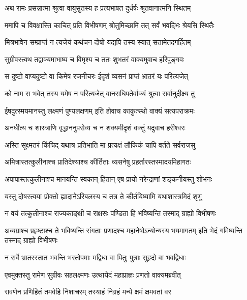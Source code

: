 
\twolineshloka
{अथ रामः प्रसन्नात्मा श्रुत्वा वायुसुतस्य ह}
{प्रत्यभाषत दुर्धर्षः श्रुतवानात्मनि स्थितम्} %

\twolineshloka
{ममापि च विवक्षास्ति काचित् प्रति विभीषणम्}
{श्रोतुमिच्छामि तत् सर्वं भवद्भिः श्रेयसि स्थितैः} %

\twolineshloka
{मित्रभावेन सम्प्राप्तं न त्यजेयं कथंचन}
{दोषो यद्यपि तस्य स्यात् सतामेतदगर्हितम्} %

\twolineshloka
{सुग्रीवस्त्वथ तद्वाक्यमाभाष्य च विमृश्य च}
{ततः शुभतरं वाक्यमुवाच हरिपुङ्गवः} %

\twolineshloka
{स दुष्टो वाप्यदुष्टो वा किमेष रजनीचरः}
{ईदृशं व्यसनं प्राप्तं भ्रातरं यः परित्यजेत्} %

\twolineshloka
{को नाम स भवेत् तस्य यमेष न परित्यजेत्}
{वानराधिपतेर्वाक्यं श्रुत्वा सर्वानुदीक्ष्य तु} %

\twolineshloka
{ईषदुत्स्मयमानस्तु लक्ष्मणं पुण्यलक्षणम्}
{इति होवाच काकुत्स्थो वाक्यं सत्यपराक्रमः} %

\twolineshloka
{अनधीत्य च शास्त्राणि वृद्धाननुपसेव्य च}
{न शक्यमीदृशं वक्तुं यदुवाच हरीश्वरः} %

\twolineshloka
{अस्ति सूक्ष्मतरं किंचिद् यथात्र प्रतिभाति मा}
{प्रत्यक्षं लौकिकं चापि वर्तते सर्वराजसु} %

\twolineshloka
{अमित्रास्तत्कुलीनाश्च प्रातिदेश्याश्च कीर्तिताः}
{व्यसनेषु प्रहर्तारस्तस्मादयमिहागतः} %

\twolineshloka
{अपापास्तत्कुलीनाश्च मानयन्ति स्वकान् हितान्}
{एष प्रायो नरेन्द्राणां शङ्कनीयस्तु शोभनः} %

\twolineshloka
{यस्तु दोषस्त्वया प्रोक्तो ह्यादानेऽरिबलस्य च}
{तत्र ते कीर्तयिष्यामि यथाशास्त्रमिदं शृणु} %

\twolineshloka
{न वयं तत्कुलीनाश्च राज्यकाङ्क्षी च राक्षसः}
{पण्डिता हि भविष्यन्ति तस्माद् ग्राह्यो विभीषणः} %

\threelineshloka
{अव्यग्राश्च प्रहृष्टाश्च ते भविष्यन्ति संगताः}
{प्रणादश्च महानेषोऽन्योन्यस्य भयमागतम्}
{इति भेदं गमिष्यन्ति तस्माद् ग्राह्यो विभीषणः} %

\twolineshloka
{न सर्वे भ्रातरस्तात भवन्ति भरतोपमाः}
{मद्विधा वा पितुः पुत्राः सुहृदो वा भवद्विधाः} %

\twolineshloka
{एवमुक्तस्तु रामेण सुग्रीवः सहलक्ष्मणः}
{उत्थायेदं महाप्राज्ञः प्रणतो वाक्यमब्रवीत्} %

\twolineshloka
{रावणेन प्रणिहितं तमवेहि निशाचरम्}
{तस्याहं निग्रहं मन्ये क्षमं क्षमवतां वर} %

